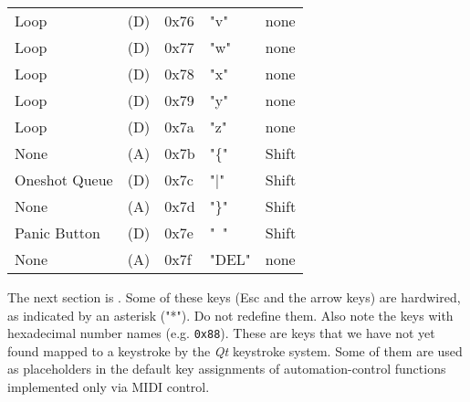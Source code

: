 \begin{table}[htb!]
\begin{tabular}{l l l l l}
        Loop               & (D)  &  0x76   & "v"          & none \\
        Loop               & (D)  &  0x77   & "w"          & none \\
        Loop               & (D)  &  0x78   & "x"          & none \\
        Loop               & (D)  &  0x79   & "y"          & none \\
        Loop               & (D)  &  0x7a   & "z"          & none \\
        None               & (A)  &  0x7b   & "\{"         & Shift \\
        Oneshot Queue      & (D)  &  0x7c   & "|"          & Shift \\
        None               & (A)  &  0x7d   & "\}"         & Shift \\
        Panic Button       & (D)  &  0x7e   & "~"          & Shift \\
        None               & (A)  &  0x7f   & "DEL"        & none \\
      \end{tabular}
   \end{table}

   The next section is .
   Some of these keys (Esc and the arrow keys) are
   hardwired, as indicated by an asterisk ("*").
   Do not redefine them.
   Also note the keys with hexadecimal number names (e.g. \texttt{0x88}).
   These are keys that we have not yet found mapped to a keystroke
   by the \textsl{Qt} keystroke system.
   Some of them are used as placeholders in the default key assignments
   of automation-control functions implemented only via MIDI control.

